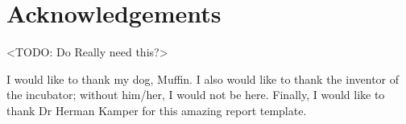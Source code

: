 \chapter*{Acknowledgements}
\makeatletter{}\makeatother

<TODO: Do Really need this?>

I would like to thank my dog, Muffin. I also would like to thank the inventor of the incubator; without him/her, I would not be here. Finally, I would like to thank Dr Herman Kamper for this amazing report template.
